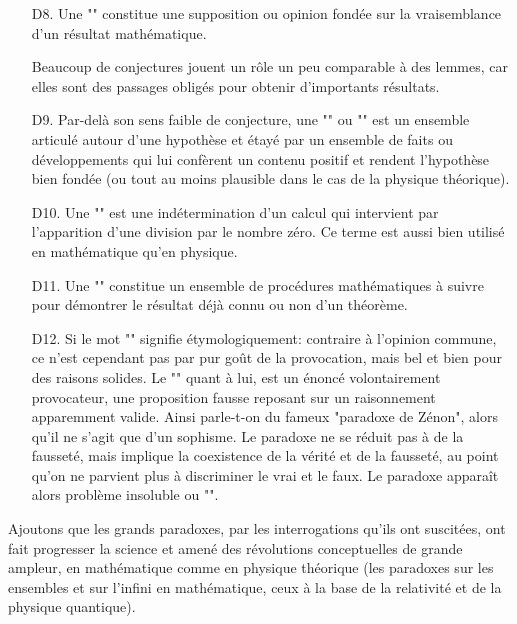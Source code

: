 \begin{itemize}
	\item[D8.] Une "" constitue une supposition ou opinion fond\'ee sur la vraisemblance d'un r\'esultat math\'ematique.
	
	Beaucoup de conjectures jouent un rôle un peu comparable à des lemmes, car elles sont des passages oblig\'es pour obtenir d'importants r\'esultats.
	
	\item[D9.] Par-delà son sens faible de conjecture, une "" ou "" est un ensemble articul\'e autour d'une hypothèse et \'etay\'e par un ensemble de faits ou d\'eveloppements qui lui confèrent un contenu positif et rendent l'hypothèse bien fond\'ee (ou tout au moins plausible dans le cas de la physique th\'eorique).

	\item[D10.]  Une "" est une ind\'etermination d'un calcul qui intervient par l'apparition d'une division par le nombre z\'ero. Ce terme est aussi bien utilis\'e en math\'ematique qu'en physique.  

	\item[D11.] Une "" constitue un ensemble de proc\'edures math\'ematiques à suivre pour d\'emontrer le r\'esultat d\'ejà connu ou non d'un th\'eorème.

	\item[D12.] Si le mot "" signifie \'etymologiquement: contraire à l'opinion commune, ce n'est cependant pas par pur goût de la provocation, mais bel et bien pour des raisons solides. Le "" quant à lui, est un \'enonc\'e volontairement provocateur, une proposition fausse reposant sur un raisonnement apparemment valide. Ainsi parle-t-on du fameux "paradoxe de Z\'enon", alors qu'il ne s'agit que d'un sophisme. Le paradoxe ne se r\'eduit pas à de la fausset\'e, mais implique la coexistence de la v\'erit\'e et de la fausset\'e, au point qu'on ne parvient plus à discriminer le vrai et le faux. Le paradoxe apparaît alors problème insoluble ou "". 
	
\end{itemize}

	\begin{tcolorbox}[title=Remarque,colframe=black,arc=10pt]
	Ajoutons que les grands paradoxes, par les interrogations qu'ils ont suscit\'ees, ont fait progresser la science et amen\'e des r\'evolutions conceptuelles de grande ampleur, en math\'ematique comme en physique th\'eorique (les paradoxes sur les ensembles et sur l'infini en math\'ematique, ceux à la base de la relativit\'e et de la physique quantique).
	\end{tcolorbox}	

